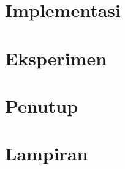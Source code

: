 \documentclass[12pt,a4paper]{report}
\begin{document}
\chapter{Implementasi}


\chapter{Eksperimen}


\chapter{Penutup}


\chapter{Lampiran}


\nocite{*}

\end{document}

